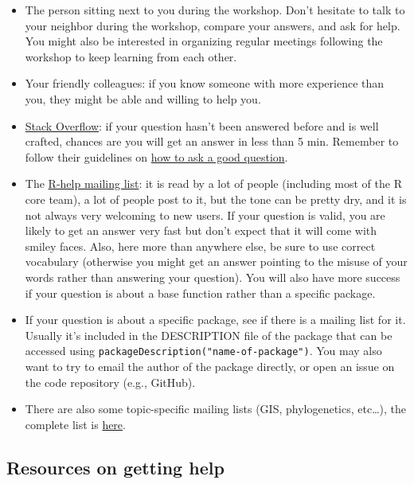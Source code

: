 \documentclass[
]{book}
\providecommand{\tightlist}{%
  \setlength{\itemsep}{0pt}\setlength{\parskip}{0pt}}
\begin{document}
\begin{itemize}
\tightlist
\item
  The person sitting next to you during the workshop. Don't hesitate to talk to
  your neighbor during the workshop, compare your answers, and ask for
  help. You might also be interested in organizing regular meetings following
  the workshop to keep learning from each other.
\item
  Your friendly colleagues: if you know someone with more experience than you,
  they might be able and willing to help you.
\item
  \href{http://stackoverflow.com/questions/tagged/r}{Stack Overflow}: if your question
  hasn't been answered before and is well crafted, chances are you will get an
  answer in less than 5 min. Remember to follow their guidelines on \href{http://stackoverflow.com/help/how-to-ask}{how to ask
  a good question}.
\item
  The \href{https://stat.ethz.ch/mailman/listinfo/r-help}{R-help mailing list}: it is
  read by a lot of people (including most of the R core team), a lot of people
  post to it, but the tone can be pretty dry, and it is not always very
  welcoming to new users. If your question is valid, you are likely to get an
  answer very fast but don't expect that it will come with smiley faces. Also,
  here more than anywhere else, be sure to use correct vocabulary (otherwise
  you might get an answer pointing to the misuse of your words rather than
  answering your question). You will also have more success if your question is
  about a base function rather than a specific package.
\item
  If your question is about a specific package, see if there is a mailing list
  for it. Usually it's included in the DESCRIPTION file of the package that can
  be accessed using \texttt{packageDescription("name-of-package")}. You may also want
  to try to email the author of the package directly, or open an issue on the
  code repository (e.g., GitHub).
\item
  There are also some topic-specific mailing lists (GIS, phylogenetics, etc\ldots),
  the complete list is \href{http://www.r-project.org/mail.html}{here}.
\end{itemize}

\subsection{Resources on getting help}\label{resources-on-getting-help}
\end{document}
